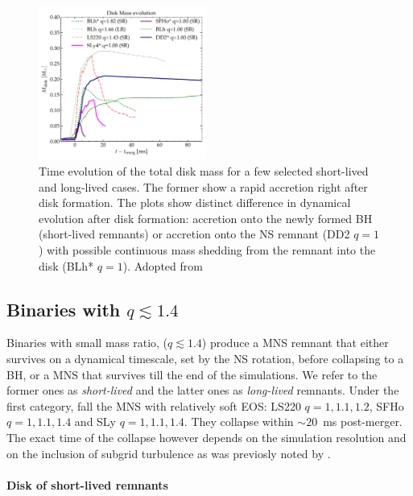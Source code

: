 \documentclass[11pt,a4paper,headinclude=true,DIV=14,BCOR=8mm,chapterprefix,listof=totoc,twoside,openright,abstracton]{scrbook}
\newcommand{\pmerg}{post-merger}
\begin{document}
\begin{figure}[t]
    \centering 
    \includegraphics[width=0.49\textwidth]{./figs/disk/total_disk_mass_evo.pdf}
    \caption{Time evolution of the total disk mass for a few selected
        short-lived and long-lived cases. The former show a rapid 
        accretion right after disk formation. The plots show
        distinct difference in dynamical evolution after disk formation: accretion onto
        the newly formed BH (short-lived remnants) or accretion onto the NS
        remnant (DD2 $q=1$) with possible continuous mass shedding from the remnant
        into the disk (BLh* $q=1$). Adopted from \citet{Nedora:2020pak}
    } 
    \label{fig:disk_mass_evo}
\end{figure}


\subsection{Binaries with $q\lesssim1.4$}


Binaries with small mass ratio, ($q\lesssim1.4$) produce a \ac{MNS} remnant
that either survives on a dynamical timescale, set by the \ac{NS} rotation, before
collapsing to a \ac{BH}, or a \ac{MNS} that survives till the end of the simulations.
We refer to the former ones as \textit{short-lived} and the latter ones as 
\textit{long-lived} remnants.
Under the first category, fall the \ac{MNS} with relatively soft \ac{EOS}:
LS220 $q=1,1.1,1.2$, SFHo $q=1,1.1,1.4$ and SLy $q=1,1.1,1.4$. 
They collapse within $\sim20$~ms \pmerg. 
The exact time of the collapse however depends on the simulation resolution 
and on the inclusion of subgrid turbulence as was previosly noted by \citet{Radice:2017zta}.

\paragraph{Disk of short-lived remnants}
\end{document}
